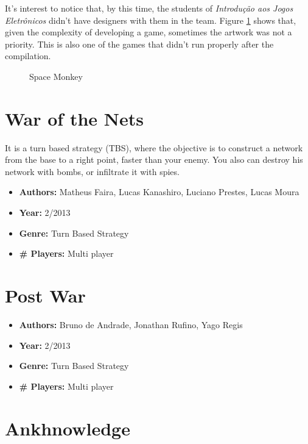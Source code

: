 \begin{apendicesenv}
It's interest to notice that, by this time, the students of \textit{Introdu\c{c}\~ao aos Jogos Eletr\^onicos} didn't have designers with them in the team. Figure \ref{fig:space_monkey} shows that, given the complexity of developing a game, sometimes the artwork was not a priority. This is also one of the games that didn't run properly after the compilation.

\begin{figure}[h!]
\centering
{}
\caption{Space Monkey}
\label{fig:space_monkey}
\end{figure}


\section{War of the Nets}
\label {sec:war}

It is a turn based strategy (TBS), where the objective is to construct a network from the base to a right point, faster than your enemy. You also can destroy his network with bombs, or infiltrate it with spies.

\begin{itemize}
\item[] \textbf{Authors:} Matheus Faira, Lucas Kanashiro, Luciano Prestes, Lucas Moura
\item[] \textbf{Year:} 2/2013
\item[] \textbf{Genre:} Turn Based Strategy
\item[] \textbf{\# Players:} Multi player
\end{itemize}

\section{Post War}
\label {sec:post_war}

\begin{itemize}
\item[] \textbf{Authors:} Bruno de Andrade, Jonathan Rufino, Yago Regis
\item[] \textbf{Year:} 2/2013
\item[] \textbf{Genre:} Turn Based Strategy
\item[] \textbf{\# Players:} Multi player
\end{itemize}

\section{Ankhnowledge}
\label {sec:ankh}


\end{apendicesenv}
